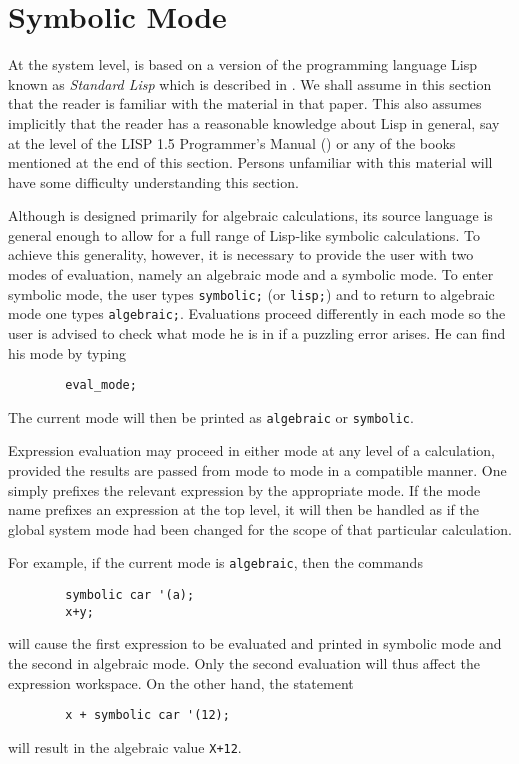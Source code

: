 \chapter{Symbolic Mode}

\hypertarget{target:modes}{}
\hypertarget{reserved:LISP}{}

At the system level, {\REDUCE} is based on a version of the programming
language Lisp known as \emph{Standard Lisp} which is described
in \cite{Marti:80}.  We shall
assume in this section that the reader is familiar with the material in
that paper.  This also assumes implicitly that the reader has a reasonable
knowledge about Lisp in general, say at the level of the LISP 1.5
Programmer's Manual (\cite{Lisp1.5:1962})
or any of the books mentioned at the end of this section.  Persons
unfamiliar with this material will have some difficulty understanding this
section.

Although {\REDUCE} is designed primarily for algebraic calculations, its
source language is general enough to allow for a full range of Lisp-like
symbolic calculations.  To achieve this generality, however, it is
necessary to provide the user with two modes of evaluation, namely an
algebraic mode and a symbolic mode. To enter symbolic mode, the user types \texttt{symbolic;}
 (or \texttt{lisp;}) and to return to
algebraic mode one types \texttt{algebraic;}.
Evaluations proceed differently in each mode so the user is advised to
check what mode he is in if a puzzling error arises.  He can find his mode
by typing
\begin{verbatim}
        eval_mode;
\end{verbatim}
The current mode will then be printed as \texttt{algebraic} or \texttt{symbolic}.

Expression evaluation may proceed in either mode at any level of a
calculation, provided the results are passed from mode to mode in a
compatible manner. One simply prefixes the relevant expression by the
appropriate mode. If the mode name prefixes an expression at the top
level, it will then be handled as if the global system mode had been
changed for the scope of that particular calculation.

For example, if the current mode is \texttt{algebraic}, then the commands
\begin{verbatim}
        symbolic car '(a);
        x+y;
\end{verbatim}
will cause the first expression to be evaluated and printed in symbolic
mode and the second in algebraic mode. Only the second evaluation will
thus affect the expression workspace. On the other hand, the statement
\begin{verbatim}
        x + symbolic car '(12);
\end{verbatim}
will result in the algebraic value \texttt{X+12}.

